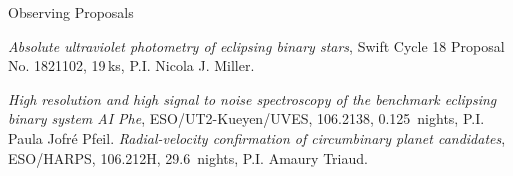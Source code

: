\begin{rubric}{Observing Proposals}

\entry*[2022]
    \textit{Absolute ultraviolet photometry of eclipsing binary stars}, Swift Cycle 18 Proposal No. 1821102, 19\,ks, P.I. Nicola J. Miller.

\entry*[2020]
    \textit{High resolution and high signal to noise spectroscopy of the benchmark eclipsing binary system AI Phe}, ESO/UT2-Kueyen/UVES, 106.2138, 0.125~nights, P.I. Paula Jofr\'{e} Pfeil.
\entry*[2020]
    \textit{Radial-velocity confirmation of circumbinary planet candidates}, ESO/HARPS, 106.212H, 29.6~nights, P.I. Amaury Triaud.
    
\end{rubric}